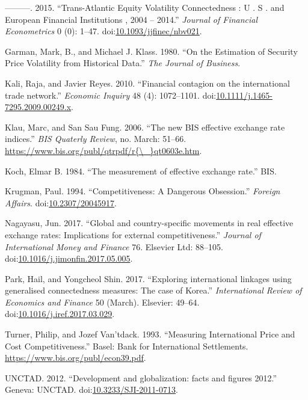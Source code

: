 \documentclass[]{elsarticle} %
\begin{document}
\hypertarget{ref-Diebold2015}{}
---------. 2015. ``Trans-Atlantic Equity Volatility Connectedness : U .
S . and European Financial Institutions , 2004 -- 2014.'' \emph{Journal
of Financial Econometrics} 0 (0): 1--47.
doi:\href{https://doi.org/10.1093/jjfinec/nbv021}{10.1093/jjfinec/nbv021}.

\hypertarget{ref-Garman1980}{}
Garman, Mark, B., and Michael J. Klass. 1980. ``On the Estimation of
Security Price Volatility from Historical Data.'' \emph{The Journal of
Business}.

\hypertarget{ref-Kali2010}{}
Kali, Raja, and Javier Reyes. 2010. ``Financial contagion on the
international trade network.'' \emph{Economic Inquiry} 48 (4):
1072--1101.
doi:\href{https://doi.org/10.1111/j.1465-7295.2009.00249.x}{10.1111/j.1465-7295.2009.00249.x}.

\hypertarget{ref-Klau2006}{}
Klau, Marc, and San Sau Fung. 2006. ``The new BIS effective exchange
rate indices.'' \emph{BIS Quaterly Review}, no. March: 51--66.
\href{https://www.bis.org/publ/qtrpdf/r\%7B/_\%7Dqt0603e.htm}{https://www.bis.org/publ/qtrpdf/r\{\textbackslash{}\_\}qt0603e.htm}.

\hypertarget{ref-Koch1984}{}
Koch, Elmar B. 1984. ``The measurement of effective exchange rate.''
BIS.

\hypertarget{ref-Krugman1994}{}
Krugman, Paul. 1994. ``Competitiveness: A Dangerous Obsession.''
\emph{Foreign Affairs}.
doi:\href{https://doi.org/10.2307/20045917}{10.2307/20045917}.

\hypertarget{ref-Nagayasu2017}{}
Nagayasu, Jun. 2017. ``Global and country-specific movements in real
effective exchange rates: Implications for external competitiveness.''
\emph{Journal of International Money and Finance} 76. Elsevier Ltd:
88--105.
doi:\href{https://doi.org/10.1016/j.jimonfin.2017.05.005}{10.1016/j.jimonfin.2017.05.005}.

\hypertarget{ref-Park2017}{}
Park, Hail, and Yongcheol Shin. 2017. ``Exploring international linkages
using generalised connectedness measures: The case of Korea.''
\emph{International Review of Economics and Finance} 50 (March).
Elsevier: 49--64.
doi:\href{https://doi.org/10.1016/j.iref.2017.03.029}{10.1016/j.iref.2017.03.029}.

\hypertarget{ref-Turner1993}{}
Turner, Philip, and Jozef Van'tdack. 1993. ``Measuring International
Price and Cost Competitiveness.'' Basel: Bank for International
Settlements. \url{https://www.bis.org/publ/econ39.pdf}.

\hypertarget{ref-UNCTAD2012}{}
UNCTAD. 2012. ``Development and globalization: facts and figures 2012.''
Geneva: UNCTAD.
doi:\href{https://doi.org/10.3233/SJI-2011-0713}{10.3233/SJI-2011-0713}.
\end{document}

